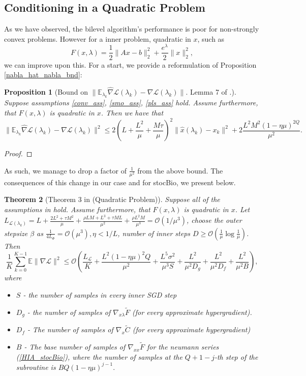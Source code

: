 \documentclass[11pt, twoside]{report}
\newtheorem{theorem}{Theorem}[section]
\newtheorem{proposition}[theorem]{Proposition}
\begin{document}
\subsection{Conditioning in a Quadratic Problem}
As we have observed, the bilevel algorithm's performance is poor for non-strongly convex problems. However for a inner problem, quadratic in $x$, such as
\[F(x,\lambda) = \frac{1}{2}\|Ax-b\|_2^2 + \frac{e^\lambda}{2}\|x\|_2^2,\]
we can improve upon this. For a start, we provide a reformulation of Proposition \ref{nabla_hat_nabla_bnd}:
\begin{proposition}[Bound on $\|\mathbb{E}_{\lambda_k} \widehat{\nabla} \mathcal{L}(\lambda_k) - \nabla \mathcal{L}(\lambda_k)\|.$ Lemma 7 of \cite{stocBio}.] \label{nabla_hat_nabla_bnd_v2}
Suppose assumptions \ref{conv_ass}, \ref{smo_ass}, \ref{pls_ass} hold. Assume furthermore, that $F(x,\lambda)$ is quadratic in $x$. Then we have that 
\[\|\mathbb{E}_{\lambda_k} \widehat{\nabla} \mathcal{L}(\lambda_k) - \nabla \mathcal{L}(\lambda_k)\|^2 \leq 2\left(L + \frac{L^2}{\mu} + \frac{M\tau}{\mu}  \right)^2 \|\hat{x}(\lambda_k) - x_k\|^2 + 2 \frac{L^2M^2(1-\eta \mu)^{2Q}}{\mu^2}.\]
\end{proposition}
\begin{proof}
    
\end{proof}
As such, we manage to drop a factor of $\frac{1}{\mu^2}$ from the above bound. The consequences of this change in our case and for stocBio, we present below.
\begin{theorem}[Theorem 3 in \cite{stocBio} (Quadratic Problem)] \label{thm3v2}
    Suppose all of the assumptions in \cite{stocBio} hold. Assume furthermore, that $F(x,\lambda)$ is quadratic in $x$. Let $L_{\mathcal{L}(\lambda_k)} = L + \frac{2L^2 + \tau M^2}{\mu} + \frac{\rho L M + L^3 + \tau M L}{\mu^2} + \frac{\rho L^2 M}{\mu^3} = \mathcal{O}(1/\mu^3)$, choose the outer stepsize $\beta$ as $\frac{1}{4 L_\Phi} = \mathcal{O}(\mu^3), \eta < 1/L$, number of inner steps $D \geq \mathcal{O}(\frac{1}{\mu} \log{\frac{1}{\mu}})$. Then
    \[\frac{1}{K} \sum_{k=0}^{K-1} \mathbb{E} \|\nabla \mathcal{L}\|^2 \leq \mathcal{O}\left( \frac{L_{\mathcal{L}}}{K} + \frac{L^2(1-\eta \mu)^2Q}{\mu^2} + \frac{L^5 \sigma^2}{\mu^3 S} + \frac{L^2}{\mu^2 D_g} + \frac{L^2}{\mu^2 D_f} + \frac{L^2}{
    \mu^2 B} \right),\]
    where
    \begin{itemize}
        \item $S$ - the number of samples in every inner SGD step
        \item $D_g$ - the number of samples of $\nabla_{x\lambda} \tilde{F}$ (for every approximate hypergradient).
        \item $D_f$ - The number of samples of $\nabla_x \tilde{C}$ (for every approximate hypergradient)
        \item $B$ - The base number of samples of $\nabla_{xx} \tilde{F}$ for the neumann series (\ref{HIA_stocBio}), where the number of samples at the $Q+1-j$-th step of the subroutine is $BQ(1-\eta\mu)^{j-1}.$
    \end{itemize}
\end{theorem}
\end{document}
